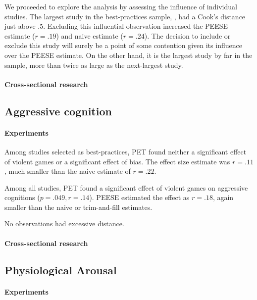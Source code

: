 \documentclass[man]{apa6}
\begin{document}
We proceeded to explore the analysis by assessing the influence of individual studies. The largest study in the best-practices sample, \citet[Study 1]{Anderson:etal:2007}, had a Cook's distance just above .5. Excluding this influential observation increased the PEESE estimate ($r=.19$) and naive estimate ($r = .24$). The decision to include or exclude this study will surely be a point of some contention given its influence over the PEESE estimate. On the other hand, it is the largest study by far in the sample, more than twice as large as the next-largest study. 

\paragraph{Cross-sectional research}

\subsection{Aggressive cognition}
\paragraph{Experiments}
Among studies selected as best-practices, PET found neither a significant effect of violent games or a significant effect of bias. The effect size estimate was $r = .11$, much smaller than the naive estimate of $r = .22$.

Among all studies, PET found a significant effect of violent games on aggressive cognitions ($p = .049, r = .14$). PEESE estimated the effect as $r = .18$, again smaller than the naive or trim-and-fill estimates. 

No observations had excessive distance. 

\paragraph{Cross-sectional research}


\subsection{Physiological Arousal}
\paragraph{Experiments}
\end{document}
